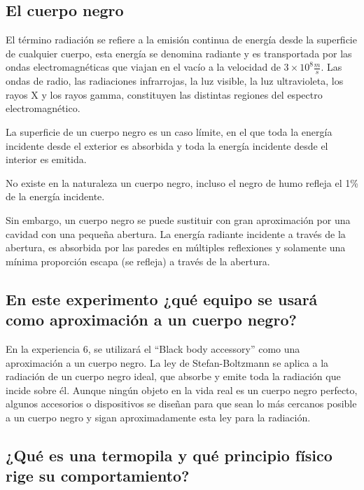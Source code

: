 \documentclass[twocolumn, 12pt]{article}
\begin{document}
\subsection{El cuerpo negro~\cite{El_cuerpo_negro}}

El término radiación se refiere a la emisión continua de
energía desde la superficie de cualquier cuerpo, esta
energía se denomina radiante y es transportada por las
ondas electromagnéticas que viajan en el vacío a la
velocidad de $3 \times 10^{8} \frac{m}{s}$. Las ondas de
radio, las radiaciones infrarrojas, la luz visible, la luz
ultravioleta, los rayos X y los rayos gamma, constituyen
las distintas regiones del espectro electromagnético.

La superficie de un cuerpo negro es un caso límite, en el
que toda la energía incidente desde el exterior es
absorbida y toda la energía incidente desde el interior es
emitida.

No existe en la naturaleza un cuerpo negro, incluso el
negro de humo refleja el 1\% de la energía incidente.

Sin embargo, un cuerpo negro se puede sustituir con gran
aproximación por una cavidad con una pequeña abertura. La
energía radiante incidente a través de la abertura, es
absorbida por las paredes en múltiples reflexiones y
solamente una mínima proporción escapa (se refleja) a
través de la abertura.

\subsection{En este experimento ¿qué equipo se usará como aproximación a un cuerpo
    negro?}

En la experiencia 6, se utilizará el ``Black body
accessory'' como una aproximación a un cuerpo negro. La ley
de Stefan-Boltzmann se aplica a la radiación de un cuerpo
negro ideal, que absorbe y emite toda la radiación que
incide sobre él. Aunque ningún objeto en la vida real es un
cuerpo negro perfecto, algunos accesorios o dispositivos se
diseñan para que sean lo más cercanos posible a un cuerpo
negro y sigan aproximadamente esta ley para la radiación.

\subsection{¿Qué es una termopila y qué principio físico rige su comportamiento?}
\end{document}
